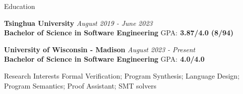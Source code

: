 \documentclass{resume} %
\newcommand{\Jun}{June }
\newcommand{\Aug}{August }
\begin{document}

\begin{rSection}{Education}


{\bf Tsinghua University} \hfill {\em \Aug 2019 - \Jun 2023} 
\\{\bf Bachelor of Science in Software Engineering} \hfill{GPA:\bf{ 3.87/4.0} (8/94)}

{\bf University of Wisconsin - Madison} \hfill {\em \Aug 2023 - Present} 
\\{\bf Bachelor of Science in Software Engineering} \hfill{GPA:\bf{ 4.0/4.0}}



\end{rSection}

\begin{rSection}{Research Interests}
Formal Verification; Program Synthesis; Language Design; Program Semantics; Proof Assistant; SMT solvers

\end{rSection}



    
\end{document}

